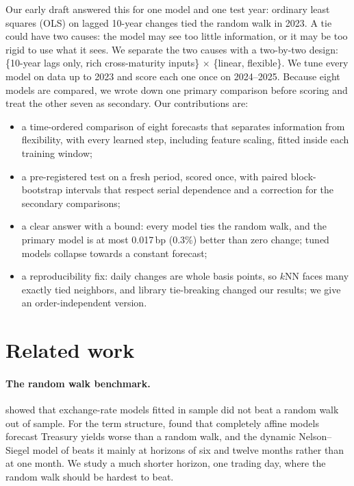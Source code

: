 \documentclass{article}
\begin{document}
Our early draft answered this for one model and one test year: ordinary least squares (OLS) on lagged 10-year changes tied the random walk in 2023. A tie could have two causes: the model may see too little information, or it may be too rigid to use what it sees. We separate the two causes with a two-by-two design: \{10-year lags only, rich cross-maturity inputs\} $\times$ \{linear, flexible\}. We tune every model on data up to 2023 and score each one once on 2024--2025. Because eight models are compared, we wrote down one primary comparison before scoring and treat the other seven as secondary. Our contributions are:
\begin{itemize}[leftmargin=*]
  \item a time-ordered comparison of eight forecasts that separates information from flexibility, with every learned step, including feature scaling, fitted inside each training window;
  \item a pre-registered test on a fresh period, scored once, with paired block-bootstrap intervals that respect serial dependence and a correction for the secondary comparisons;
  \item a clear answer with a bound: every model ties the random walk, and the primary model is at most 0.017\,bp (0.3\%) better than zero change; tuned models collapse towards a constant forecast;
  \item a reproducibility fix: daily changes are whole basis points, so $k$NN faces many exactly tied neighbors, and library tie-breaking changed our results; we give an order-independent version.
\end{itemize}

\section{Related work}\label{sec:related}
\paragraph{The random walk benchmark.} \citet{meese1983} showed that exchange-rate models fitted in sample did not beat a random walk out of sample. For the term structure, \citet{duffee2002} found that completely affine models forecast Treasury yields worse than a random walk, and the dynamic Nelson--Siegel model of \citet{diebold2006} beats it mainly at horizons of six and twelve months rather than at one month. We study a much shorter horizon, one trading day, where the random walk should be hardest to beat.
\end{document}
